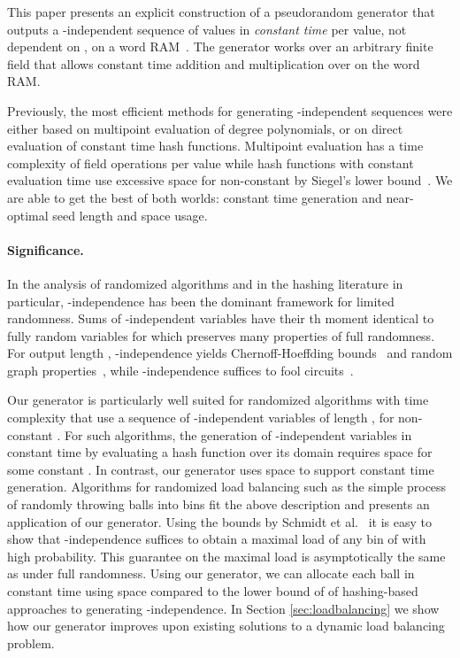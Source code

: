 \documentclass[a4paper,11pt]{article}
\theoremstyle{plain}
\theoremstyle{definition}
\begin{document}
This paper presents an explicit construction of a pseudorandom generator that outputs a -independent sequence of values in \emph{constant time} per value, not dependent on , on a word RAM~\cite{hagerup1998}. 
The generator works over an arbitrary finite field that allows constant time addition and multiplication over  on the word RAM.

Previously, the most efficient methods for generating -independent sequences were either based on multipoint evaluation of degree  polynomials, or on direct evaluation of constant time hash functions.
Multipoint evaluation has a time complexity of  field operations per value while hash functions with constant evaluation time use excessive space for non-constant  by Siegel's lower bound~\cite{siegel2004}.
We are able to get the best of both worlds: constant time generation and near-optimal seed length and space usage. 

\paragraph{Significance.}
In the analysis of randomized algorithms and in the hashing literature in particular, -independence has been the dominant framework for limited randomness. 
Sums of -independent variables have their th moment identical to fully random variables for  which preserves many properties of full randomness.
For output length , -independence yields Chernoff-Hoeffding bounds~\cite{schmidt1995} and random graph properties~\cite{alon2008},
while -independence suffices to fool  circuits~\cite{braverman2010}.

Our generator is particularly well suited for randomized algorithms with time complexity  that use a sequence of -independent variables of length , for non-constant .
For such algorithms, the generation of -independent variables in constant time by evaluating a hash function over its domain requires space  for some constant . 
In contrast, our generator uses space  to support constant time generation. 
Algorithms for randomized load balancing such as the simple process of randomly throwing  balls into  bins fit the above description and presents an application of our generator.
Using the bounds by Schmidt et al.~\mbox{\cite[Theorem 2]{schmidt1995}} it is easy to show that -independence suffices to obtain a maximal load of any bin of  with high probability.
This guarantee on the maximal load is asymptotically the same as under full randomness. 
Using our generator, we can allocate each ball in constant time using space  compared to the lower bound of  of hashing-based approaches to generating -independence. 
In Section \ref{sec:loadbalancing} we show how our generator improves upon existing solutions to a dynamic load balancing problem.
\end{document}
